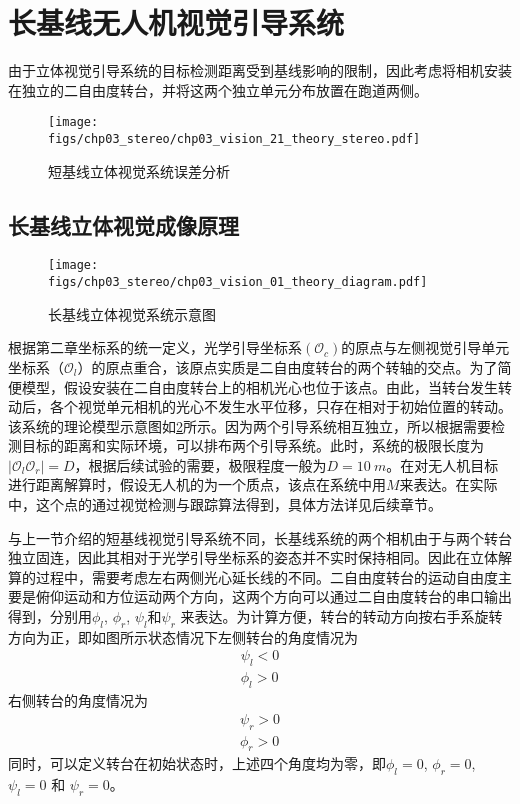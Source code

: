 \section{长基线无人机视觉引导系统}
由于立体视觉引导系统的目标检测距离受到基线影响的限制，因此考虑将相机安装在独立的二自由度转台，并将这两个独立单元分布放置在跑道两侧。

\begin{figure}[!tb]
	\centering
	\texttt{[image: figs/chp03\_stereo/chp03\_vision\_21\_theory\_stereo.pdf]}	
	\caption{短基线立体视觉系统误差分析}
	\label{fig:chp03_vision_21_theory_stereo}
\end{figure}


\subsection{长基线立体视觉成像原理}


\begin{figure}[!tb]
	\centering
	\texttt{[image: figs/chp03\_stereo/chp03\_vision\_01\_theory\_diagram.pdf]}	
	\caption{长基线立体视觉系统示意图}
	\label{fig:chp03_vision_01_theory_diagram}
\end{figure}

根据第二章坐标系的统一定义，光学引导坐标系$(\mathcal{O}_c)$的原点与左侧视觉引导单元坐标系（$\mathcal{O}_l$）的原点重合，该原点实质是二自由度转台的两个转轴的交点。为了简便模型，假设安装在二自由度转台上的相机光心也位于该点。由此，当转台发生转动后，各个视觉单元相机的光心不发生水平位移，只存在相对于初始位置的转动。该系统的理论模型示意图如\ref{fig:chp03_vision_01_theory_diagram}所示。因为两个引导系统相互独立，所以根据需要检测目标的距离和实际环境，可以排布两个引导系统。此时，系统的极限长度为$|\mathcal{O}_l\mathcal{O}_r| = D$，根据后续试验的需要，极限程度一般为$D = 10\ m$。在对无人机目标进行距离解算时，假设无人机的为一个质点，该点在系统中用$M$来表达。在实际中，这个点的通过视觉检测与跟踪算法得到，具体方法详见后续章节。

与上一节介绍的短基线视觉引导系统不同，长基线系统的两个相机由于与两个转台独立固连，因此其相对于光学引导坐标系的姿态并不实时保持相同。因此在立体解算的过程中，需要考虑左右两侧光心延长线的不同。二自由度转台的运动自由度主要是俯仰运动和方位运动两个方向，这两个方向可以通过二自由度转台的串口输出得到，分别用${\phi_l}$, ${\phi_r}$, ${\psi_l}$和${\psi_r}$ 来表达。为计算方便，转台的转动方向按右手系旋转方向为正，即如图所示状态情况下左侧转台的角度情况为
\begin{align}
\psi_l < 0 \\
\phi_l > 0
\end{align}
右侧转台的角度情况为
\begin{align}
\psi_r > 0 \\
\phi_r > 0
\end{align}
同时，可以定义转台在初始状态时，上述四个角度均为零，即$\phi_l= 0$, $\phi_r=0$, ${\psi_l=0}$ 和 ${\psi_r=0}$。


